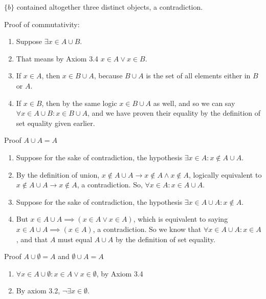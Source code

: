 \documentclass{article}
\begin{document}
\begin{enumerate}
\begin{enumerate}
                    $\{b\}$ contained altogether three distinct objects, a contradiction.
            \end{enumerate}
            Proof of commutativity:
            \begin{enumerate}
                \item Suppose $\exists x \in A \cup B$. 
                \item That means by Axiom 3.4 $x \in A \lor x \in B$. 
                \item If $x \in A$, then $x \in B \cup A$, because $B \cup A$
                    is the set of all elements either in $B$ or $A$.  
                \item If $x \in B$, then by the same logic $x \in B \cup A$ as
                    well, and so we can say $\forall x \in A \cup B: x \in B
                    \cup A$, and we have proven their equality by the
                    definition of set equality given earlier.
            \end{enumerate}
            Proof $A \cup A = A$
            \begin{enumerate}
                \item Suppose for the sake of contradiction, the hypothesis $\exists x \in A: x \notin A \cup A$.
                \item By the definition of union, $x \notin A \cup A
                    \rightarrow x \notin A \land x \notin A$, logically
                    equivalent to $x \notin A \cup A \rightarrow x \notin A$,
                    a contradiction. So, $\forall x \in A: x
                    \in A \cup A$. 
                \item Suppose for the sake of contradiction, the hypothesis $\exists x \in A \cup A: x \notin A$.
                \item But $x \in A \cup A \implies (x \in A \lor x \in A)$,
                    which is equivalent to saying $x \in A \cup A \implies (x
                    \in A)$, a contradiction. So we know that $\forall x \in A
                    \cup A: x \in A$, and that $A$ must equal $A \cup A$ by the
                    definition of set equality.
            \end{enumerate}
            Proof $A \cup \emptyset = A$ and $\emptyset \cup A = A$
            \begin{enumerate}
                \item $\forall x \in A \cup \emptyset: x \in A \lor x \in \emptyset$, by Axiom 3.4
                \item By axiom 3.2, $\neg\exists x \in \emptyset$.

\end{enumerate}
\end{enumerate}
\end{document}
